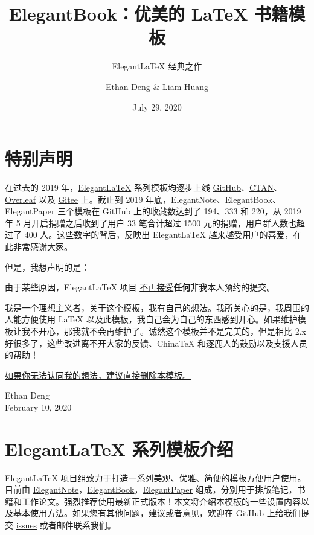 \documentclass[cn,11pt]{elegantbook}
\title{ElegantBook：优美的 \LaTeX{} 书籍模板}
\subtitle{Elegant\LaTeX{} 经典之作}
\author{Ethan Deng \& Liam Huang}
\institute{Elegant\LaTeX{} Program}
\date{July 29, 2020}
\begin{document}
\maketitle
\frontmatter

\chapter*{特别声明}

在过去的 2019 年，\href{https://elegantlatex.org/}{Elegant\LaTeX{}} 系列模板均逐步上线 \href{https://github.com/ElegantLaTeX}{GitHub}、\href{https://ctan.org/pkg/elegantbook}{CTAN}、\href{https://www.overleaf.com/latex/templates/elegantbook-template/zpsrbmdsxrgy}{Overleaf} 以及 \href{https://gitee.com/ElegantLaTeX/ElegantBook}{Gitee} 上。截止到 2019 年底，ElegantNote、ElegantBook、ElegantPaper 三个模板在 GitHub 上的收藏数达到了 194、333 和 220，从 2019 年 5 月开启捐赠之后收到了用户 33 笔合计超过 1500 元的捐赠，用户群人数也超过了 400 人。这些数字的背后，反映出 Elegant\LaTeX{} 越来越受用户的喜爱，在此非常感谢大家。

但是，我想声明的是：

\begin{center}
  由于某些原因，Elegant\LaTeX{} 项目 \underline{不再接受}\textbf{任何}非我本人预约的提交。
\end{center}

我是一个理想主义者，关于这个模板，我有自己的想法。我所关心的是，我周围的人能方便使用 \LaTeX{} 以及此模板，我自己会为自己的东西感到开心。如果维护模板让我不开心，那我就不会再维护了。诚然这个模板并不是完美的，但是相比 2.x 好很多了，这些改进离不开大家的反馈、China\TeX{} 和逐鹿人的鼓励以及支援人员的帮助！

\underline{如果你无法认同我的想法，建议直接删除本模板。}

\vskip 1.5cm

\begin{flushright}
Ethan Deng\\
February 10, 2020
\end{flushright}

\tableofcontents

\mainmatter
\chapter{Elegant\LaTeX{} 系列模板介绍}

Elegant\LaTeX{} 项目组致力于打造一系列美观、优雅、简便的模板方便用户使用。目前由 \href{https://github.com/ElegantLaTeX/ElegantNote}{ElegantNote}，\href{https://github.com/ElegantLaTeX/ElegantBook}{ElegantBook}，\href{https://github.com/ElegantLaTeX/ElegantPaper}{ElegantPaper} 组成，分别用于排版笔记，书籍和工作论文。强烈推荐使用最新正式版本！本文将介绍本模板的一些设置内容以及基本使用方法。如果您有其他问题，建议或者意见，欢迎在 GitHub 上给我们提交 \href{https://github.com/ElegantLaTeX/ElegantBook/issues}{issues} 或者邮件联系我们。
\end{document}
